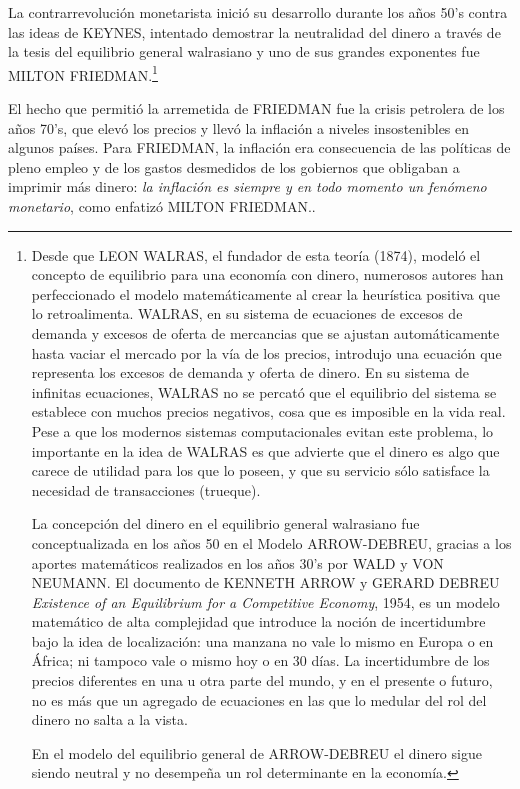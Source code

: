 \documentclass[10pt,a4paper]{article}
\begin{document}
La contrarrevolución monetarista inició su desarrollo durante los años 50's contra las ideas de KEYNES, intentado demostrar la neutralidad del dinero a través de la tesis del equilibrio general walrasiano y uno de sus grandes exponentes fue MILTON FRIEDMAN.\footnote{%
    Desde que LEON WALRAS, el fundador de esta teoría (1874), modeló el concepto de equilibrio para una economía con dinero, numerosos autores han perfeccionado el modelo matemáticamente al crear la heurística positiva que lo retroalimenta. WALRAS, en su sistema de ecuaciones de excesos de demanda y excesos de oferta de mercancias que se ajustan automáticamente hasta vaciar el mercado por la vía de los precios, introdujo una ecuación que representa los excesos de demanda y oferta de dinero. En su sistema de infinitas ecuaciones, WALRAS no se percató que el equilibrio del sistema se establece con muchos precios negativos, cosa que es imposible en la vida real. Pese a que los modernos sistemas computacionales evitan este problema, lo importante en la idea de WALRAS es que advierte que el dinero es algo que carece de utilidad para los que lo poseen, y que su servicio sólo satisface la necesidad de transacciones (trueque).

La concepción del dinero en el equilibrio general walrasiano fue conceptualizada en los años 50 en el Modelo ARROW-DEBREU, gracias a los aportes matemáticos realizados en los años 30's por WALD y VON NEUMANN. El documento de KENNETH ARROW y GERARD DEBREU \textit{Existence of an Equilibrium for a Competitive Economy}, 1954, es un modelo matemático de alta complejidad que introduce la noción de incertidumbre bajo la idea de localización: una manzana no vale lo mismo en Europa o en África; ni tampoco vale o mismo hoy o en 30 días. La incertidumbre de los precios diferentes en una u otra parte del mundo, y en el presente o futuro, no es más que un agregado de ecuaciones en las que lo medular del rol del dinero no salta a la vista.

En el modelo del equilibrio general de ARROW-DEBREU el dinero sigue siendo neutral y no desempeña un rol determinante en la economía.
} 

El hecho que permitió la arremetida de FRIEDMAN fue la crisis petrolera de los años 70's, que elevó los precios y llevó la inflación a niveles insostenibles en algunos países. Para FRIEDMAN, la inflación era consecuencia de las políticas de pleno empleo y de los gastos desmedidos de los gobiernos que obligaban a imprimir más dinero: \textit{la inflación es siempre y en todo momento un fenómeno monetario}, como enfatizó MILTON FRIEDMAN..
\end{document}
